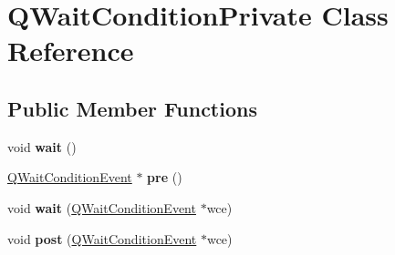 \hypertarget{class_q_wait_condition_private}{}\section{Q\+Wait\+Condition\+Private Class Reference}
\label{class_q_wait_condition_private}
\subsection*{Public Member Functions}
\begin{DoxyCompactItemize}
\item 
\mbox{\label{class_q_wait_condition_private_a2864b8d283d2a2c757e825e5dc8a24d0}} 
void {\bfseries wait} ()
\item 
\mbox{\label{class_q_wait_condition_private_a7cf44da862c6a1fca494253cd0568f53}} 
\mbox{\hyperlink{class_q_wait_condition_event}{Q\+Wait\+Condition\+Event}} $\ast$ {\bfseries pre} ()
\item 
\mbox{\label{class_q_wait_condition_private_a0d3212d380cfcebb7d2e5b02084779c2}} 
void {\bfseries wait} (\mbox{\hyperlink{class_q_wait_condition_event}{Q\+Wait\+Condition\+Event}} $\ast$wce)
\item 
\mbox{\label{class_q_wait_condition_private_af61c25946c95528afeb30c4ac26e4f40}} 
void {\bfseries post} (\mbox{\hyperlink{class_q_wait_condition_event}{Q\+Wait\+Condition\+Event}} $\ast$wce)
\end{DoxyCompactItemize}
